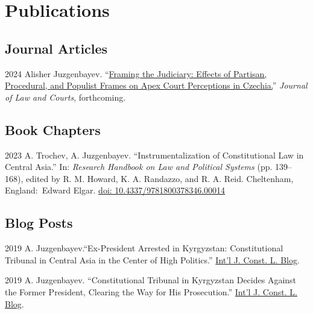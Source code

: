 \documentclass[11pt,letterpaper]{report}
\begin{document}
    \section*{Publications}

   \subsection*{Journal Articles}

   \begin{tablist}

       

        \item[2024] \tab{}Alisher Juzgenbayev. \enquote{\href{https://osf.io/preprints/osf/3u7ak}{Framing the Judiciary: Effects of Partisan, Procedural, and Populist Frames on Apex Court Perceptions in Czechia.}} \textit{Journal of Law and Courts}, forthcoming.

      

    \end{tablist}



    \subsection*{Book Chapters}

    \begin{tablist}

        \item[2023] \tab{}A. Trochev, A. Juzgenbayev. \enquote{Instrumentalization of Constitutional Law in Central Asia.} In: \textit{Research Handbook on Law and Political Systems} (pp. 139--168), edited by R. M. Howard, K. A. Randazzo, and  R. A. Reid. Cheltenham, England:\ Edward Elgar. \href{https://doi.org/10.4337/9781800378346.00014}{doi: 10.4337/9781800378346.00014}

    \end{tablist}

    \subsection*{Blog Posts}

    \begin{tablist}
        
        \item[2019] \tab{}A. Juzgenbayev.\enquote{Ex-President Arrested in Kyrgyzstan: Constitutional Tribunal in Central Asia in the Center of High Politics.} \href{http://www.iconnectblog.com/2019/08/ex-president-arrested-in-kyrgyzstan-constitutional-tribunal-in-central-asia-in-the-center-of-high-politics/}{Int’l J. Const. L. Blog}. 
        \item[2019] \tab{}A. Juzgenbayev. \enquote{Constitutional Tribunal in Kyrgyzstan Decides Against the Former President, Clearing the Way for His Prosecution.} \href{http://www.iconnectblog.com/2019/11/constitutional-tribunal-in-kyrgyzstan-decides-against-the-former-president-clearing-the-way-for-his-prosecution/}{Int’l J. Const. L. Blog}.
    \end{tablist}
\end{document}
